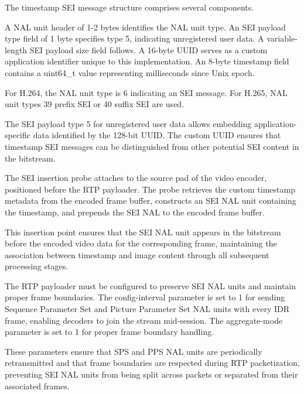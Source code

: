 \documentclass{erauthesis}
\begin{document}

The timestamp SEI message structure comprises several components.

A NAL unit header of 1-2 bytes identifies the NAL unit type.
An SEI payload type field of 1 byte specifies type 5, indicating unregistered user data.
A variable-length SEI payload size field follows.
A 16-byte UUID serves as a custom application identifier unique to this implementation.
An 8-byte timestamp field contains a uint64\_t value representing milliseconds since Unix epoch.

For H.264, the NAL unit type is 6 indicating an SEI message.
For H.265, NAL unit types 39 prefix SEI or 40 suffix SEI are used.

The SEI payload type 5 for unregistered user data allows embedding application-specific data identified by the 128-bit UUID.
The custom UUID ensures that timestamp SEI messages can be distinguished from other potential SEI content in the bitstream.


The SEI insertion probe attaches to the source pad of the video encoder, positioned before the RTP payloader.
The probe retrieves the custom timestamp metadata from the encoded frame buffer, constructs an SEI NAL unit containing the timestamp, and prepends the SEI NAL to the encoded frame buffer.

This insertion point ensures that the SEI NAL unit appears in the bitstream before the encoded video data for the corresponding frame, maintaining the association between timestamp and image content through all subsequent processing stages.


The RTP payloader must be configured to preserve SEI NAL units and maintain proper frame boundaries.
The config-interval parameter is set to 1 for sending Sequence Parameter Set and Picture Parameter Set NAL units with every IDR frame, enabling decoders to join the stream mid-session.
The aggregate-mode parameter is set to 1 for proper frame boundary handling.

These parameters ensure that SPS and PPS NAL units are periodically retransmitted and that frame boundaries are respected during RTP packetization, preventing SEI NAL units from being split across packets or separated from their associated frames.

\end{document}
